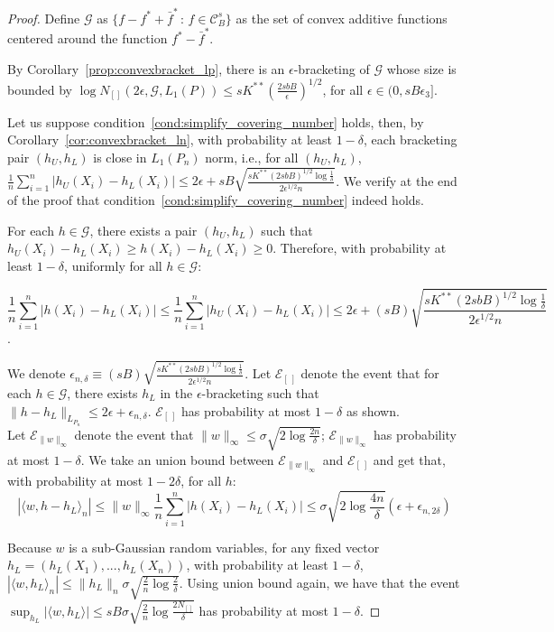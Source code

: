\begin{proof}
Define $\mathcal{G}$ as $\{ f - f^* + \bar{f}^* \,:\, f \in \mathcal{C}^s_B \}$ as the set of convex additive functions centered around the function $f^* - \bar{f}^*$. 

By Corollary~\ref{prop:convexbracket_lp}, there is an $\epsilon$-bracketing of $\mathcal{G}$ whose size is bounded by $\log N_{[]}( 2\epsilon, \mathcal{G}, L_1(P)) \leq sK^{**} \left( \frac{2sbB}{\epsilon} \right)^{1/2}$, for all $\epsilon \in (0, sB \epsilon_3]$.

Let us suppose condition~\ref{cond:simplify_covering_number} holds, then, by Corollary~\ref{cor:convexbracket_ln}, with probability at least $1-\delta$, each bracketing pair $(h_U, h_L)$ is close in $L_1(P_n)$ norm, i.e., for all $(h_U, h_L)$, 
$\frac{1}{n} \sum_{i=1}^n | h_U(X_i) - h_L(X_i) | \leq 2 \epsilon + sB \sqrt{ \frac{sK^{**}(2sbB
)^{1/2} \log \frac{1}{\delta}}{2\epsilon^{1/2} n}}$. We verify at the end of the proof that condition~\ref{cond:simplify_covering_number} indeed holds.


For each $h \in \mathcal{G}$, there exists a pair $(h_U, h_L)$ such that $h_U(X_i) - h_L(X_i) \geq h(X_i) - h_L(X_i) \geq 0$. Therefore, with probability at least $1-\delta$, uniformly for all $h \in \mathcal{G}$:

$$
\frac{1}{n} \sum_{i=1}^n |h(X_i) - h_L(X_i)| \leq \frac{1}{n} \sum_{i=1}^n | h_U(X_i) - h_L(X_i)| \leq 2\epsilon +  (sB) \sqrt{ \frac{sK^{**}(2sbB)^{1/2} \log \frac{1}{\delta}}{2\epsilon^{1/2} n}}
$$.

We denote $\epsilon_{n,\delta} \equiv (sB) \sqrt{ \frac{sK^{**}(2sbB)^{1/2} \log \frac{1}{\delta}}{2\epsilon^{1/2} n}}$. Let $\mathcal{E}_{[\,]}$ denote the event that for each $h \in \mathcal{G}$, there exists $h_L$ in the $\epsilon$-bracketing such that $\|h-h_L\|_{L_{P_n}} \leq 2\epsilon + \epsilon_{n, \delta}$. $\mathcal{E}_{[\,]}$ has probability at most $1-\delta$ as shown.\\

Let $\mathcal{E}_{\|w\|_\infty}$ denote the event that $\| w \|_\infty \leq \sigma \sqrt{ 2\log \frac{2n}{\delta}}$; $\mathcal{E}_{\|w\|_\infty}$ has probability at most $1-\delta$. We take an union bound between $\mathcal{E}_{\|w\|_\infty}$ and $\mathcal{E}_{[\,]}$ and get that, with probability at most $1-2\delta$, for all $h$:
\[
|\langle w, h - h_L\rangle_n| \leq \| w \|_\infty \frac{1}{n} \sum_{i=1}^n |h(X_i) - h_L(X_i)| \leq
  \sigma \sqrt{2 \log \frac{4n}{\delta}} \left( \epsilon + \epsilon_{n,2\delta} \right)
\]


Because $w$ is a sub-Gaussian random variables, for any fixed vector $h_L = (h_L(X_1),...,h_L(X_n))$, with probability at least $1-\delta$, $|\langle w, h_L \rangle_n | \leq \| h_L \|_n \sigma \sqrt{ \frac{2}{n} \log \frac{2}{\delta} }$. Using union bound again, we have that the event $\sup_{h_L} |\langle w, h_L \rangle| \leq sB \sigma \sqrt{ \frac{2}{n}\log \frac{2 N_{[]}}{\delta}}$ has probability at most $1-\delta$.


\end{proof}
